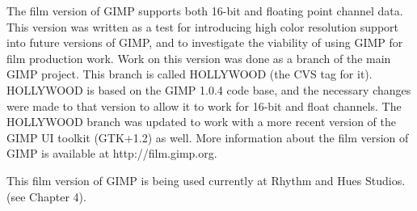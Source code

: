 The film version of GIMP supports both 16-bit and floating point channel data.
This version was written as a test for introducing high color resolution
support into future versions of GIMP, and to investigate the viability of using
GIMP for film production work. Work on this version was done as a branch of the
main GIMP project. This branch is called HOLLYWOOD (the CVS tag for it).
HOLLYWOOD is based on the GIMP 1.0.4 code base, and the necessary changes were
made to that version to allow it to work for 16-bit and float channels. The
HOLLYWOOD branch was updated to work with a more recent version of the GIMP UI 
toolkit (GTK+1.2) as well.  More information about the film version of GIMP is
available at http://film.gimp.org.

This film version of GIMP is being used currently at Rhythm and Hues Studios.
(see Chapter 4).
